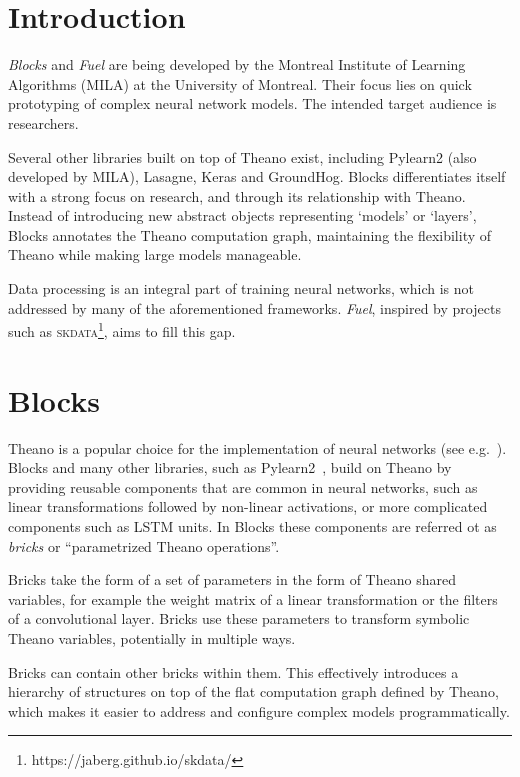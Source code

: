 \documentclass[twoside,11pt]{article}
\begin{document}
\section{Introduction}

\emph{Blocks} and \emph{Fuel} are being developed by the Montreal Institute of
Learning Algorithms (MILA) at the University of Montreal. Their focus lies on
quick prototyping of complex neural network models. The intended target
audience is researchers.

Several other libraries built on top of Theano exist, including Pylearn2 (also
developed by MILA), Lasagne, Keras and GroundHog. Blocks differentiates itself
with a strong focus on research, and through its relationship with Theano.
Instead of introducing new abstract objects representing `models' or `layers',
Blocks annotates the Theano computation graph, maintaining the flexibility of
Theano while making large models manageable.

Data processing is an integral part of training neural networks, which is not
addressed by many of the aforementioned frameworks. \emph{Fuel}, inspired by
projects such as \textsc{skdata}\footnote{https://jaberg.github.io/skdata/},
aims to fill this gap.

\section{Blocks}

Theano is a popular choice for the implementation of neural networks (see
e.g.~\cite{Goodfellow-et-al-ICML2013, Pascanu-et-al-ICML2013}). Blocks and many
other libraries, such as Pylearn2~\cite{pylearn2_arxiv_2013}, build on Theano
by providing reusable components that are common in neural networks, such as
linear transformations followed by non-linear activations, or more complicated
components such as LSTM units. In Blocks these components are referred ot as
\emph{bricks} or ``parametrized Theano operations''.

Bricks take the form of a set of parameters in the form of Theano shared
variables, for example the weight matrix of a linear transformation or the
filters of a convolutional layer. Bricks use these parameters to transform
symbolic Theano variables, potentially in multiple ways.

Bricks can contain other bricks within them. This effectively introduces a
hierarchy of structures on top of the flat computation graph defined by Theano,
which makes it easier to address and configure complex models programmatically.
\end{document}
